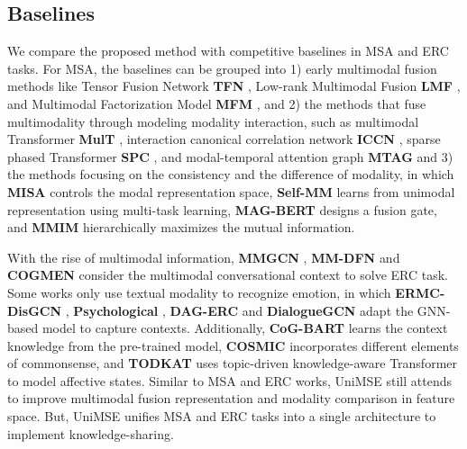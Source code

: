 \documentclass[11pt]{article}
\begin{document}
\subsection{Baselines}
We compare the proposed method with competitive baselines in MSA and ERC tasks. For MSA, the baselines can be grouped into 1) early multimodal fusion methods like {Tensor Fusion Network \bf TFN} \cite{DBLP:conf/emnlp/ZadehCPCM17}, {Low-rank Multimodal Fusion \bf LMF} \cite{DBLP:conf/acl/MorencyLZLSL18}, and {Multimodal Factorization Model \bf MFM} \cite{DBLP:conf/iclr/TsaiLZMS19}, and 2) the methods that fuse multimodality through modeling modality interaction, such as multimodal Transformer {\bf MulT} \cite{DBLP:conf/acl/TsaiBLKMS19}, interaction canonical correlation network {\bf ICCN} \cite{DBLP:conf/aaai/SunSSL20}, sparse phased Transformer {\bf SPC} \cite{DBLP:conf/emnlp/ChengFB021}, and modal-temporal attention graph {\bf MTAG} \cite{DBLP:conf/naacl/YangWYZRZPM21} and 3) the methods focusing on the consistency and the difference of modality, in which {\bf MISA} \cite{DBLP:conf/mm/HazarikaZP20} controls the modal representation space, {\bf Self-MM} \cite{DBLP:conf/aaai/YuXYW21} learns from unimodal representation using multi-task learning, {\bf MAG-BERT} \cite{DBLP:conf/acl/RahmanHLZMMH20} designs a fusion gate, and {\bf MMIM} \cite{DBLP:conf/emnlp/HanCP21} hierarchically maximizes the mutual information. 

With the rise of multimodal information, {\bf MMGCN} \cite{DBLP:conf/acl/HuLZJ20}, {\bf MM-DFN} \cite{DBLP:conf/icassp/HuHWJM22} and {\bf COGMEN} \cite{DBLP:journals/corr/abs-2205-02455} consider the multimodal conversational context to solve ERC task. Some works only use textual modality to recognize emotion, in which {\bf ERMC-DisGCN} \cite{DBLP:conf/emnlp/SunYF21}, 
{\bf Psychological} \cite{DBLP:conf/emnlp/Li00W21}, {\bf DAG-ERC} \cite{DBLP:conf/acl/ShenWYQ20} and {\bf DialogueGCN} \cite{DBLP:conf/emnlp/GhosalMPCG19} adapt the GNN-based model to capture contexts. Additionally, {\bf CoG-BART} \cite{DBLP:journals/corr/abs-2112-11202} learns the context knowledge from the pre-trained model, {\bf COSMIC} \cite{DBLP:conf/emnlp/GhosalMGMP20} incorporates different elements of commonsense, and {\bf TODKAT} \cite{DBLP:conf/acl/ZhuP0ZH20} uses topic-driven knowledge-aware Transformer to model affective states.
Similar to MSA and ERC works, UniMSE still attends to improve multimodal fusion representation and modality comparison in feature space. But, UniMSE unifies MSA and ERC tasks into a single architecture to implement knowledge-sharing.
\end{document}
